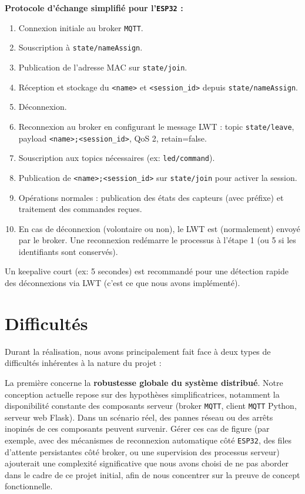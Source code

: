 \documentclass[12pt]{article}
\begin{document}
\textbf{Protocole d'échange simplifié pour l'\texttt{ESP32} :}
\begin{enumerate}
    \item Connexion initiale au broker \texttt{MQTT}.
    \item Souscription à \texttt{state/nameAssign}.
    \item Publication de l'adresse MAC sur \texttt{state/join}.
    \item Réception et stockage du \texttt{<name>} et \texttt{<session\_id>} depuis \texttt{state/nameAssign}.
    \item Déconnexion.
    \item Reconnexion au broker en configurant le message LWT : topic \texttt{state/leave}, payload \texttt{<name>;<session\_id>}, QoS 2, retain=false.
    \item Souscription aux topics nécessaires (ex: \texttt{led/command}).
    \item Publication de \texttt{<name>;<session\_id>} sur \texttt{state/join} pour activer la session.
    \item Opérations normales : publication des états des capteurs (avec préfixe) et traitement des commandes reçues.
    \item En cas de déconnexion (volontaire ou non), le LWT est (normalement) envoyé par le broker. Une reconnexion redémarre le processus à l'étape 1 (ou 5 si les identifiants sont conservés).
\end{enumerate}
Un keepalive court (ex: 5 secondes) est recommandé pour une détection rapide des déconnexions via LWT (c'est ce que nous
avons implémenté).

\section{Difficultés}

Durant la réalisation, nous avons principalement fait face à deux types de difficultés inhérentes à la nature du projet :

La première concerne la \textbf{robustesse globale du système distribué}. Notre conception actuelle repose sur des hypothèses simplificatrices, notamment la disponibilité constante des composants serveur (broker \texttt{MQTT}, client \texttt{MQTT} Python, serveur web Flask). Dans un scénario réel, des pannes réseau ou des arrêts inopinés de ces composants peuvent survenir. Gérer ces cas de figure (par exemple, avec des mécanismes de reconnexion automatique côté \texttt{ESP32}, des files d'attente persistantes côté broker, ou une supervision des processus serveur) ajouterait une complexité significative que nous avons choisi de ne pas aborder dans le cadre de ce projet initial, afin de nous concentrer sur la preuve de concept fonctionnelle.
\end{document}
